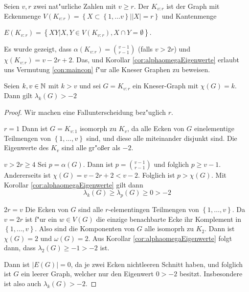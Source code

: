 Seien $v,r$ zwei nat"urliche Zahlen mit $v\geq r$. Der  $K_{v:r}$ ist der Graph mit Eckenmenge $V(K_{v:r}) = \left\{ X \subset \left\{ 1,\dots v \right\} | |X| = r \right\}$ und Kantenmenge 

\parindent 0pt $E(K_{v:r}) = \left\{ XY| X,Y \in V(K_{v:r}), X \cap Y = \emptyset \right\}$. 

\parindent 15pt Es wurde gezeigt, dass $\alpha(K_{v:r}) = \binom{v-1}{r-1}$ (falls $v >2r$) und $\chi(K_{v:r}) = v-2r+2$. Das, und  Korollar \ref{cor:alphaomegaEigenwerte} erlaubt uns Vermutung \ref{con:maincon} f"ur alle Kneser Graphen zu beweisen. 

\begin{proposition}
  Seien $k,v\in {\mathbb{N}}$ mit $k>v$ und sei $G= K_{v:r}$ ein Kneser-Graph mit $\chi(G) = k$. Dann gilt $\lambda_{k}(G) > -2$
\end{proposition}

\begin{proof}
  Wir machen eine Fallunterscheidung bez"uglich $r$. 

   {$r=1$} Dann ist $G=K_{v:1}$ isomorph zu $K_v$, da alle Ecken von $G$ einelementige Teilmengen von $\left\{ 1,\dots, v \right\}$ sind, und diese alle miteinander disjunkt sind. Die Eigenwerte des $K_v$ sind alle gr"o{\ss}er als $-2$. 

   {$v > 2r \geq 4 $} Sei $p = \alpha(G)$.  Dann ist $ p = \binom{v-1}{r-1}$ und folglich $ p \geq v-1$. Andererseits ist $\chi(G) = v-2r+2 < v-2$. Folglich ist $p > \chi(G)$. Mit  Korollar \ref{cor:alphaomegaEigenwerte} gilt dann \begin{equation*}
    \lambda_{k}(G) \geq \lambda_{p}(G) \geq 0 > -2
  \end{equation*}

   {$2r = v $} Die Ecken von $G$ sind alle $r$-elementingen Teilmengen von $\left\{ 1,\dots,v \right\}$. Da $v=2r$ ist f"ur ein $w\in V(G)$ die einzige benachbarte Ecke ihr Komplement in $\left\{ 1,\dots,v \right\}$. Also sind die Komponenten von $G$ alle isomoprh zu $K_{2}$. Dann ist $\chi(G) = 2$ und $\omega(G) = 2$. Aus Korollar \ref{cor:alphaomegaEigenwerte} folgt dann, dass $\lambda_{2}(G) \geq -1 > -2$ ist.

   Dann ist $|E(G)| = 0$, da je zwei Ecken nichtleeren Schnitt haben, und folglich ist $G$ ein leerer Graph, welcher nur den Eigenwert $0>-2$ besitzt. Insbesondere ist also auch $\lambda_{k}(G) > -2$.
\end{proof}

